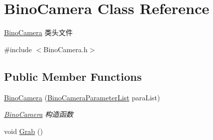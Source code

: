 \hypertarget{classBinoCamera}{}\section{Bino\+Camera Class Reference}
\label{classBinoCamera}


\hyperlink{classBinoCamera}{Bino\+Camera} 类头文件  




{\ttfamily \#include $<$Bino\+Camera.\+h$>$}

\subsection*{Public Member Functions}
\begin{DoxyCompactItemize}
\item 
\hyperlink{classBinoCamera_a6fd6ce57220e1d4bd1dcfa2a72d7014c}{Bino\+Camera} (\hyperlink{structBinoCameraParameterList}{Bino\+Camera\+Parameter\+List} para\+List)
\begin{DoxyCompactList}\small\item\em \hyperlink{classBinoCamera}{Bino\+Camera} 构造函数 \end{DoxyCompactList}\item 
void \hyperlink{classBinoCamera_a0fae8840cca8c98e2a030c8243c0d42a}{Grab} ()\hypertarget{classBinoCamera_a0fae8840cca8c98e2a030c8243c0d42a}{}\label{classBinoCamera_a0fae8840cca8c98e2a030c8243c0d42a}


\end{DoxyCompactItemize}

